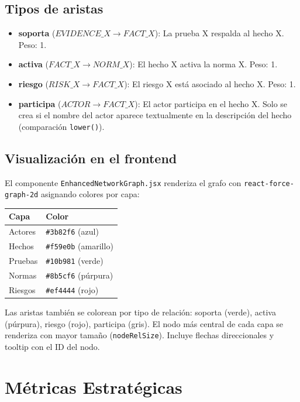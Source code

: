 \documentclass[12pt, letterpaper]{article}
\begin{document}
\subsection{Tipos de aristas}

\begin{itemize}[nosep]
  \item \textbf{soporta} ($EVIDENCE\_X \rightarrow FACT\_X$):
    La prueba X respalda al hecho X. Peso: 1.
  \item \textbf{activa} ($FACT\_X \rightarrow NORM\_X$):
    El hecho X activa la norma X. Peso: 1.
  \item \textbf{riesgo} ($RISK\_X \rightarrow FACT\_X$):
    El riesgo X está asociado al hecho X. Peso: 1.
  \item \textbf{participa} ($ACTOR \rightarrow FACT\_X$):
    El actor participa en el hecho X. Solo se crea si el nombre
    del actor aparece textualmente en la descripción del hecho
    (comparación \texttt{lower()}).
\end{itemize}

\subsection{Visualización en el frontend}

El componente \texttt{EnhancedNetworkGraph.jsx} renderiza el grafo
con \texttt{react-force-graph-2d} asignando colores por capa:

\begin{center}
\begin{tabular}{ll}
\toprule
\textbf{Capa} & \textbf{Color} \\
\midrule
Actores & \texttt{\#3b82f6} (azul) \\
Hechos & \texttt{\#f59e0b} (amarillo) \\
Pruebas & \texttt{\#10b981} (verde) \\
Normas & \texttt{\#8b5cf6} (púrpura) \\
Riesgos & \texttt{\#ef4444} (rojo) \\
\bottomrule
\end{tabular}
\end{center}

\noindent Las aristas también se colorean por tipo de relación:
soporta (verde), activa (púrpura), riesgo (rojo), participa (gris).
El nodo más central de cada capa se renderiza con mayor tamaño
(\texttt{nodeRelSize}). Incluye flechas direccionales y tooltip con
el ID del nodo.

\newpage
\section{Métricas Estratégicas}
\end{document}
